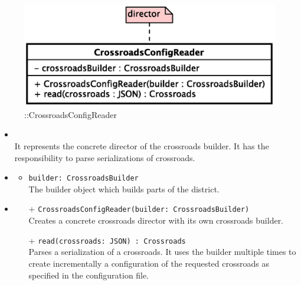 \begin{figure}[h]
\centering
\includegraphics[scale=0.6,keepaspectratio]{images/solution/app/backend/crossroads_config_reader.eps}
\caption{\pReactiveBuild::CrossroadsConfigReader}
\label{fig:sd-app-crossroads-config-reader}
\end{figure}
\FloatBarrier
\begin{itemize}
  \item \textbf{\descr} \\
    It represents the concrete director of the crossroads builder.
    It has the responsibility to parse serializations of crossroads.
    \item \textbf{\attrs}
  \begin{itemize}
    \item \texttt{builder: CrossroadsBuilder} \\
The builder object which builds parts of the district.
  \end{itemize}
  \item \textbf{\ops}
  \begin{itemize} 
    \item[+] \texttt{CrossroadsConfigReader(builder: CrossroadsBuilder)} \\
Creates a concrete crossroads director with its own crossroads builder.
    \item[+] \texttt{read(crossroads: JSON) : Crossroads} \\
Parses a serialization of a crossroads.
It uses the builder multiple times 
to create incrementally a configuration of the requested crossroads as specified
in the configuration file. 
  \end{itemize}
\end{itemize}
